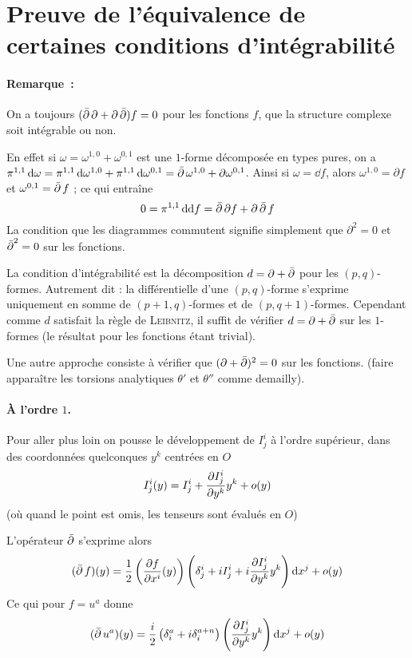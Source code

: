 \documentclass[12pt,draft]{article}
\begin{document}
\section{Preuve de l'équivalence de certaines conditions d’intégrabilité}\label{preuveintegrabilite}

\paragraph*{Remarque~:} On a toujours $(\operatorname{\bar{\partial}} \partial + \partial \operatorname{\bar{\partial}})f = 0$ pour les fonctions $f$, que la structure complexe soit intégrable ou non.

En effet si $\omega = \omega^{1,0} + \omega^{0,1}$ est une $1$-forme décomposée en types pures, on a $\pi^{1,1}\operatorname{d\!} \omega = \pi^{1,1}\operatorname{d\!}  \omega^{1,0} + \pi^{1,1}\operatorname{d\!} \omega^{0,1} = \operatorname{\bar{\partial}} \omega^{1,0} + \partial \omega^{0,1}$. Ainsi si $\omega = \dd f$, alors $\omega^{1,0} = \partial f$ et $\omega^{0,1} = \operatorname{\bar{\partial}} f$ ; ce qui entraîne
\[
0 = \pi^{1,1} \operatorname{d\!} \operatorname{d\!} f = \operatorname{\bar{\partial}} \partial f + \partial \operatorname{\bar{\partial}} f
\]
La condition que les diagrammes commutent signifie simplement que $\partial^2 = 0$ et $\operatorname{\bar{\partial}}^2 = 0$ sur les fonctions.


La condition d'intégrabilité est la décomposition $d =  \partial + \operatorname{\bar{\partial}}$ pour les $(p,q)$-formes. Autrement dit : la différentielle d'une $(p,q)$-forme s’exprime uniquement en somme de $(p+1,q)$-formes et de $(p,q+1)$-formes. Cependant comme $d$ satisfait la règle de \textsc{Leibnitz}, il suffit de vérifier $d = \partial + \operatorname{\bar{\partial}}$ sur les $1$-formes (le résultat pour les fonctions étant trivial).

Une autre approche consiste à vérifier que $(\partial + \operatorname{\bar{\partial}})^2 = 0$ sur les fonctions.  (faire apparaître les torsions analytiques $\theta'$ et $\theta''$ comme demailly). 




\iffalse
\paragraph*{À l'ordre $1$.}
Pour aller plus loin on pousse le développement de $I^i_j$ à l'ordre supérieur, dans des coordonnées quelconques $y^k$ centrées en $O$
\[
I^i_j(y) = I^i_j + \dfrac{\partial{I^i_j}}{\partial{y^k}} y^k + o(y)
\]
(où quand le point est omis, les tenseurs sont évalués en $O$)

L'opérateur $\operatorname{\bar{\partial}}$ s'exprime alors
\[
(\operatorname{\bar{\partial}} f)(y) = \operatorname{\frac{1}{2}} \left(
\dfrac{\partial{f}}{\partial{x^i}}(y)
\right)\left(\delta^i_j + i I^{i}_j + i\dfrac{\partial{I^i_j}}{\partial{y^k}} y^k\right) \operatorname{d\!} x^j + o(y)
\]
Ce qui pour $f=u^a$ donne
\[
(\operatorname{\bar{\partial}} u^a)(y) = \dfrac{i}{2}
\left(
\delta^a_i + i \delta^{a+n}_i
\right)
\left(\dfrac{\partial{I^i_j}}{\partial{y^k}} y^k\right) \operatorname{d\!} x^j + o(y)
\]
\end{document}
